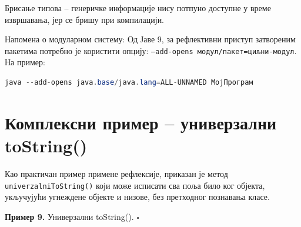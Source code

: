 Брисање типова – генеричке информације нису потпуно доступне у време извршавања, јер се бришу при компилацији.


Напомена о модуларном систему: Од Јаве 9, за рефлективни приступ затвореним пакетима потребно је користити опцију: \texttt{--add-opens модул/пакет=циљни-модул}. На пример:

\begin{lstlisting}[language=Java]
java --add-opens java.base/java.lang=ALL-UNNAMED МојПрограм
\end{lstlisting}

\section{Комплексни пример – универзални toString()}

Као практичан пример примене рефлексије, приказан је метод \texttt{univerzalniToString()} који може исписати сва поља било ког објекта, укључујући угнеждене објекте и низове, без претходног познавања класе.


\bigskip

\noindent \textbf{Пример 9.} Универзални toString(). $\square$

\medskip

